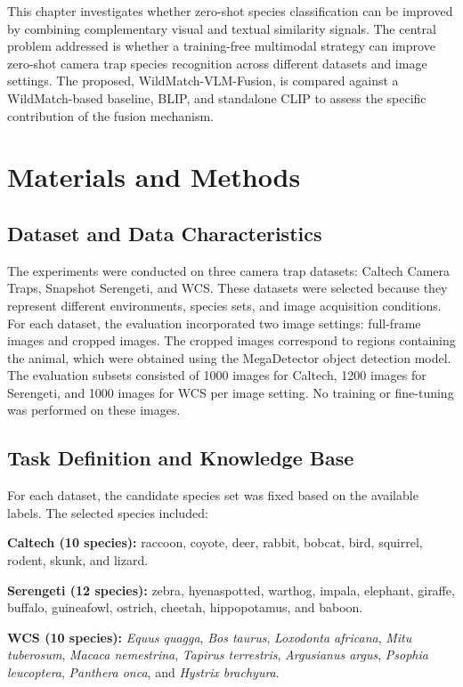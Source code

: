 This chapter investigates whether zero-shot species classification can be improved by combining complementary visual and textual similarity signals. The central problem addressed is whether a training-free multimodal strategy can improve zero-shot camera trap species recognition across different datasets and image settings. The proposed, WildMatch-VLM-Fusion, is compared against a WildMatch-based baseline, BLIP, and standalone CLIP to assess the specific contribution of the fusion mechanism.

\section{Materials and Methods}

\subsection{Dataset and Data Characteristics}
The experiments were conducted on three camera trap datasets: Caltech Camera Traps, Snapshot Serengeti, and WCS. These datasets were selected because they represent different environments, species sets, and image acquisition conditions. For each dataset, the evaluation incorporated two image settings: full-frame images and cropped images. The cropped images correspond to regions containing the animal, which were obtained using the MegaDetector object detection model. The evaluation subsets consisted of 1000 images for Caltech, 1200 images for Serengeti, and 1000 images for WCS per image setting. No training or fine-tuning was performed on these images.

\subsection{Task Definition and Knowledge Base}
For each dataset, the candidate species set was fixed based on the available labels. The selected species included:

\textbf{Caltech (10 species):} raccoon, coyote, deer, rabbit, bobcat, bird, squirrel, rodent, skunk, and lizard.

\textbf{Serengeti (12 species):} zebra, hyenaspotted, warthog, impala, elephant, giraffe, buffalo, guineafowl, ostrich, cheetah, hippopotamus, and baboon.

\textbf{WCS (10 species):} \textit{Equus quagga}, \textit{Bos taurus}, \textit{Loxodonta africana}, \textit{Mitu tuberosum}, \textit{Macaca nemestrina}, \textit{Tapirus terrestris}, \textit{Argusianus argus}, \textit{Psophia leucoptera}, \textit{Panthera onca}, and \textit{Hystrix brachyura}.

